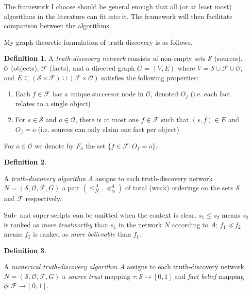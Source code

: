 \documentclass{article}
\theoremstyle{definition}
\newtheorem{definition}{Definition}
\theoremstyle{plain}
\theoremstyle{remark}
\renewcommand{\S}{\mathcal{S}}  %
\renewcommand{\O}{\mathcal{O}}  %
\newcommand{\F}{\mathcal{F}}
\newcommand{\sle}{\le}
\newcommand{\fle}{\preceq}
\begin{document}
The framework I choose should be general enough that all (or at least most)
algorithms in the literature can fit into it. The framework will then
facilitate comparison between the algorithms.

My graph-theoretic formulation of truth-discovery is as follows.

\begin{definition}

A \emph{truth-discovery network} consists of non-empty sets $\S$ (sources),
$\O$ (objects), $\F$ (facts), and a directed graph $G=(V, E)$ where
$V = \S \cup \F \cup \O$, and $E \subseteq (\S \times \F) \cup (\F \times \O)$
satisfies the following properties:

\begin{enumerate}

\item Each $f \in \F$ has a unique successor node in $\O$, denoted $O_f$ (i.e.
each fact relates to a single object)

\item For $s \in \S$ and $o \in \O$, there is at most one $f \in \F$ such that
$(s, f) \in E$ and $O_f = o$ (i.e. sources can only claim one fact per object)

\end{enumerate}

For $o \in \O$ we denote by $F_o$ the set $\{f \in \F : O_f = o \}$.

\end{definition}

\begin{definition}
\label{def:truth_discovery_algorithm}

A \emph{truth-discovery algorithm} $A$ assigns to each truth-discovery network
$N=(\S, \O, \F, G)$ a pair $(\sle_N^A, \fle_N^A)$
of total (weak) orderings on the sets $\S$ and $\F$
respectively.

Sub- and super-scripts can be omitted when the context is clear. $s_1 \sle s_2$
means $s_2$ is ranked as \emph{more trustworthy} than $s_1$ in the network $N$
according to $A$; $f_1 \fle f_2$ means $f_2$ is ranked as \emph{more
believable} than $f_1$.

\end{definition}

\begin{definition}
\label{def:numerical}

A \emph{numerical truth-discovery algorithm} $A$ assigns to each
truth-discovery network $N=(\S, \O, \F, G)$ a \emph{source trust} mapping
$\tau: \S \rightarrow [0, 1]$ and \emph{fact belief} mapping
$\phi: \F \rightarrow [0, 1]$.

\end{definition}
\end{document}
